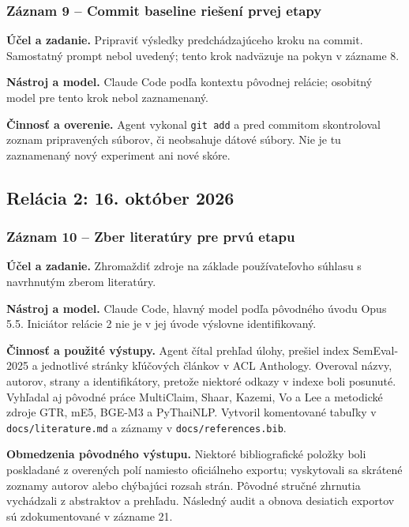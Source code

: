 \subsubsection*{Záznam 9 -- Commit baseline riešení prvej etapy}


\par\noindent \textbf{Účel a zadanie.} Pripraviť výsledky predchádzajúceho kroku na commit. Samostatný prompt nebol uvedený; tento krok nadväzuje na pokyn v zázname 8.\par\smallskip
\par\noindent \textbf{Nástroj a model.} Claude Code podľa kontextu pôvodnej relácie; osobitný model pre tento krok nebol zaznamenaný.\par\smallskip
\par\noindent \textbf{Činnosť a overenie.} Agent vykonal \texttt{git \allowbreak{}add} a pred commitom skontroloval zoznam pripravených súborov, či neobsahuje dátové súbory. Nie je tu zaznamenaný nový experiment ani nové skóre.\par\smallskip

\subsection*{Relácia 2: 16. október 2026}

\subsubsection*{Záznam 10 -- Zber literatúry pre prvú etapu}


\par\noindent \textbf{Účel a zadanie.} Zhromaždiť zdroje na základe používateľovho súhlasu s navrhnutým zberom literatúry.\par\smallskip
\par\noindent \textbf{Nástroj a model.} Claude Code, hlavný model podľa pôvodného úvodu Opus 5.5. Iniciátor relácie 2 nie je v jej úvode výslovne identifikovaný.\par\smallskip
\par\noindent \textbf{Činnosť a použité výstupy.} Agent čítal prehľad úlohy, prešiel index SemEval-2025 a jednotlivé stránky kľúčových článkov v ACL Anthology. Overoval názvy, autorov, strany a identifikátory, pretože niektoré odkazy v indexe boli posunuté. Vyhľadal aj pôvodné práce MultiClaim, Shaar, Kazemi, Vo a Lee a metodické zdroje GTR, mE5, BGE-M3 a PyThaiNLP. Vytvoril komentované tabuľky v \texttt{docs/\allowbreak{}literature.\allowbreak{}md} a záznamy v \texttt{docs/\allowbreak{}references.\allowbreak{}bib}.\par\smallskip
\par\noindent \textbf{Obmedzenia pôvodného výstupu.} Niektoré bibliografické položky boli poskladané z overených polí namiesto oficiálneho exportu; vyskytovali sa skrátené zoznamy autorov alebo chýbajúci rozsah strán. Pôvodné stručné zhrnutia vychádzali z abstraktov a prehľadu. Následný audit a obnova desiatich exportov sú zdokumentované v zázname 21.\par\smallskip

